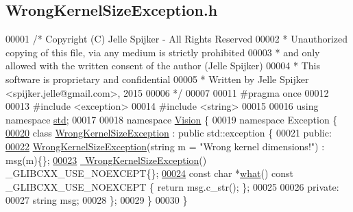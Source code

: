\hypertarget{_wrong_kernel_size_exception_8h_source}{}\subsection{Wrong\+Kernel\+Size\+Exception.\+h}
\label{_wrong_kernel_size_exception_8h_source}

\begin{DoxyCode}
00001 \textcolor{comment}{/* Copyright (C) Jelle Spijker - All Rights Reserved}
00002 \textcolor{comment}{ * Unauthorized copying of this file, via any medium is strictly prohibited}
00003 \textcolor{comment}{ * and only allowed with the written consent of the author (Jelle Spijker)}
00004 \textcolor{comment}{ * This software is proprietary and confidential}
00005 \textcolor{comment}{ * Written by Jelle Spijker <spijker.jelle@gmail.com>, 2015}
00006 \textcolor{comment}{ */}
00007 
00011 \textcolor{preprocessor}{#pragma once}
00012 
00013 \textcolor{preprocessor}{#include <exception>}
00014 \textcolor{preprocessor}{#include <string>}
00015 
00016 \textcolor{keyword}{using namespace }\hyperlink{namespacestd}{std};
00017 
00018 \textcolor{keyword}{namespace }\hyperlink{namespace_vision}{Vision} \{
00019 \textcolor{keyword}{namespace }Exception \{
\hypertarget{_wrong_kernel_size_exception_8h_source_l00020}{}\hyperlink{class_vision_1_1_exception_1_1_wrong_kernel_size_exception}{00020} \textcolor{keyword}{class }\hyperlink{class_vision_1_1_exception_1_1_wrong_kernel_size_exception}{WrongKernelSizeException} : \textcolor{keyword}{public} std::exception \{
00021 \textcolor{keyword}{public}:
\hypertarget{_wrong_kernel_size_exception_8h_source_l00022}{}\hyperlink{class_vision_1_1_exception_1_1_wrong_kernel_size_exception_aa508534e1d81ab9b14e8abf156660fb4}{00022}   \hyperlink{class_vision_1_1_exception_1_1_wrong_kernel_size_exception_aa508534e1d81ab9b14e8abf156660fb4}{WrongKernelSizeException}(\textcolor{keywordtype}{string} m = \textcolor{stringliteral}{"Wrong kernel dimensions!"}) : msg(m)\{\};
\hypertarget{_wrong_kernel_size_exception_8h_source_l00023}{}\hyperlink{class_vision_1_1_exception_1_1_wrong_kernel_size_exception_a9b7e79b2201337021162b6685365cbb9}{00023}   \hyperlink{class_vision_1_1_exception_1_1_wrong_kernel_size_exception_a9b7e79b2201337021162b6685365cbb9}{~WrongKernelSizeException}() \_GLIBCXX\_USE\_NOEXCEPT\{\};
\hypertarget{_wrong_kernel_size_exception_8h_source_l00024}{}\hyperlink{class_vision_1_1_exception_1_1_wrong_kernel_size_exception_a5be675f9584d0c16a98bdb97f75d3287}{00024}   \textcolor{keyword}{const} \textcolor{keywordtype}{char} *\hyperlink{class_vision_1_1_exception_1_1_wrong_kernel_size_exception_a5be675f9584d0c16a98bdb97f75d3287}{what}() const \_GLIBCXX\_USE\_NOEXCEPT \{ \textcolor{keywordflow}{return} msg.c\_str(); \};
00025 
00026 \textcolor{keyword}{private}:
00027   \textcolor{keywordtype}{string} msg;
00028 \};
00029 \}
00030 \}
\end{DoxyCode}
